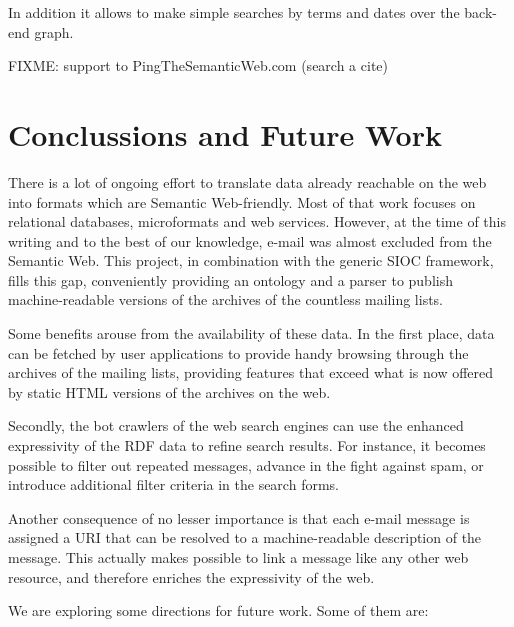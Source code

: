 \documentclass{llncs}
\begin{document}
In addition it allows to make simple searches by terms and dates over the back-end graph.

FIXME: support to PingTheSemanticWeb.com (search a cite)

\section{\label{sec:conclussions}Conclussions and Future Work}

There is a lot of ongoing effort to translate data already reachable
on the web into formats
which are Semantic Web-friendly. Most of that work focuses on relational
databases, microformats and web services. However, at the time of this
writing and to the best of our knowledge, e-mail was almost excluded from the
Semantic Web. This project, in combination with the generic SIOC framework,
fills this gap, conveniently providing
an ontology and a parser to publish machine-readable versions of the
archives of the countless mailing lists.

Some benefits arouse from the availability of these data. In the first
place, data can be fetched by user applications to provide handy browsing
through the archives of the mailing lists, providing features that
exceed what is now offered by static HTML versions of the archives on
the web.

Secondly, the bot crawlers of the web search engines can use the enhanced
expressivity of the RDF data to refine search results. For instance, it
becomes possible to filter out repeated messages, advance in the fight against
spam, or introduce additional filter criteria in the search forms.

Another consequence of no lesser importance is that each e-mail message
is assigned a URI that can be resolved to a machine-readable description
of the message. This actually makes possible to link a message like
any other web resource, and therefore enriches the expressivity of the
web.

We are exploring some directions for future work. Some of them are:
\end{document}
